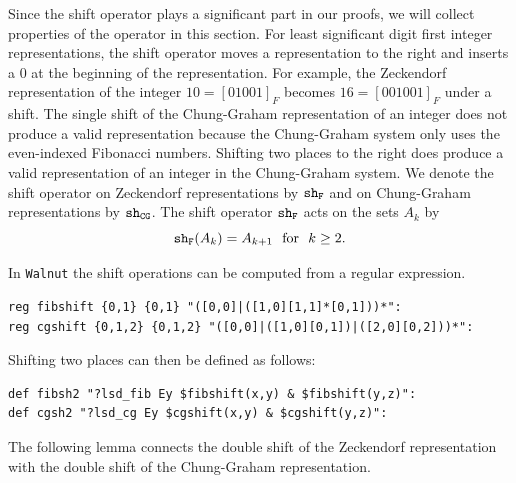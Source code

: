 \documentclass[12pt]{article}
\theoremstyle{plain}
\theoremstyle{case}
\theoremstyle{definition}
\begin{document}
Since the shift operator plays a significant part in our proofs, we will collect properties of the operator in this section. For least significant digit first integer representations, the shift operator moves a representation to the right and inserts a $0$ at the beginning of the representation. For example, the Zeckendorf representation of the integer $10 = [01001]_F$ becomes $16 = [001001]_F$ under a shift. The single shift of the Chung-Graham representation of an integer does not produce a valid representation because the Chung-Graham system only uses the even-indexed Fibonacci numbers. Shifting two places to the right does produce a valid representation of an integer in the Chung-Graham system. We denote the shift operator on Zeckendorf representations by ${\tt sh_F}$ and on Chung-Graham representations by ${\tt sh_{CG}}$. The shift operator ${\tt sh_F}$ acts on the sets $A_k$ by 
\begin{equation}
\label{shak}
{\tt sh_F} (A_k) = A_{k+1} \,\, \text{  for  } \,\, k \geq 2.
\end{equation}

In {\tt Walnut} the shift operations can be computed from a regular expression.
\begin{verbatim}
reg fibshift {0,1} {0,1} "([0,0]|([1,0][1,1]*[0,1]))*":
reg cgshift {0,1,2} {0,1,2} "([0,0]|([1,0][0,1])|([2,0][0,2]))*":
\end{verbatim}

Shifting two places can then be defined as follows:
\begin{verbatim}
def fibsh2 "?lsd_fib Ey $fibshift(x,y) & $fibshift(y,z)":
def cgsh2 "?lsd_cg Ey $cgshift(x,y) & $cgshift(y,z)":
\end{verbatim}

\bigskip

The following lemma connects the double shift of the Zeckendorf representation with the double shift of the Chung-Graham representation.

\bigskip
\end{document}
